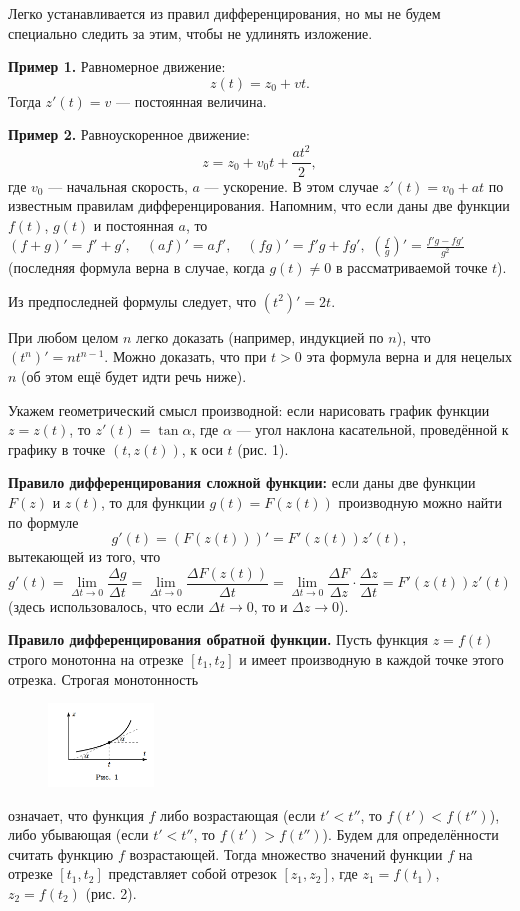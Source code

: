 \documentclass{article}
\begin{document}
Легко устанавливается из правил дифференцирования, но мы не будем специально следить за этим, чтобы не удлинять изложение.

\textbf{Пример 1.} Равномерное движение:
\[
z(t) = z_0 + vt.
\]
Тогда \( z'(t) = v \) — постоянная величина.

\textbf{Пример 2.} Равноускоренное движение:
\[
z = z_0 + v_0 t + \frac{a t^2}{2},
\]
где \( v_0 \) — начальная скорость, \( a \) — ускорение. В этом случае
\(
z'(t) = v_0 + at
\)
по известным правилам дифференцирования. Напомним, что если даны две функции \( f(t) \), \( g(t) \) и постоянная \( a \), то
\(
(f+g)' = f' + g', \quad (af)' = af', \quad (fg)' = f'g + fg',
\)
\(
\left( \frac{f}{g} \right)' = \frac{f'g - fg'}{g^2}
\)
(последняя формула верна в случае, когда \( g(t) \neq 0 \) в рассматриваемой точке \( t \)).

Из предпоследней формулы следует, что \( (t^2)' = 2t \).

При любом целом \( n \) легко доказать (например, индукцией по \( n \)), что \( (t^n)' = n t^{n-1} \). Можно доказать, что при \( t > 0 \) эта формула верна и для нецелых \( n \) (об этом ещё будет идти речь ниже).

Укажем геометрический смысл производной: если нарисовать график функции \( z = z(t) \), то \( z'(t) = \tan \alpha \), где \( \alpha \) — угол наклона касательной, проведённой к графику в точке \( (t, z(t)) \), к оси \( t \) (рис. 1).

\textbf{Правило дифференцирования сложной функции:} если даны две функции \( F(z) \) и \( z(t) \), то для функции \( g(t) = F(z(t)) \) производную можно найти по формуле
\[
g'(t) = (F(z(t)))' = F'(z(t)) z'(t),
\]
вытекающей из того, что
\[
g'(t) = \lim_{\Delta t \to 0} \frac{\Delta g}{\Delta t} = \lim_{\Delta t \to 0} \frac{\Delta F(z(t))}{\Delta t} = \lim_{\Delta t \to 0} \frac{\Delta F}{\Delta z} \cdot \frac{\Delta z}{\Delta t} = F'(z(t)) z'(t)
\]
(здесь использовалось, что если \( \Delta t \to 0 \), то и \( \Delta z \to 0 \)).

\textbf{Правило дифференцирования обратной функции.} Пусть функция \( z = f(t) \) строго монотонна на отрезке \( [t_1, t_2] \) и имеет производную в каждой точке этого отрезка. Строгая монотонность
\begin{figure}
  \centering
  \includegraphics[width=0.25\textwidth]{g.png}
\end{figure}
означает, что функция \( f \) либо возрастающая (если \( t' < t'' \), то \( f(t') < f(t'') \)), либо убывающая (если \( t' < t'' \), то \( f(t') > f(t'') \)). Будем для определённости считать функцию \( f \) возрастающей. Тогда множество значений функции \( f \) на отрезке \( [t_1, t_2] \) представляет собой отрезок \( [z_1, z_2] \), где \( z_1 = f(t_1) \), \( z_2 = f(t_2) \) (рис. 2). 
\end{document}
